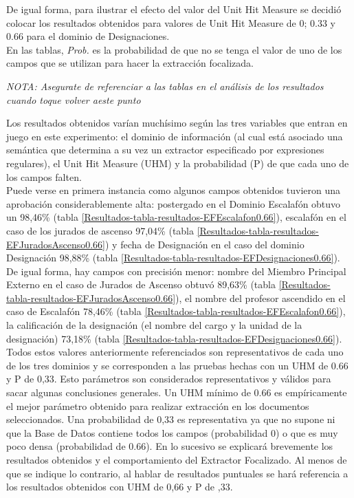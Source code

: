 De igual forma, para ilustrar el efecto del valor del Unit Hit Measure se decidió colocar los resultados obtenidos para valores de Unit Hit Measure de 0; 0.33 y 0.66 para el dominio de Designaciones.\\

En las tablas, \emph{Prob.} es la probabilidad de que no se tenga el valor de uno de los campos que se utilizan para hacer la extracción focalizada.

\emph{NOTA: Asegurate de referenciar a las tablas en el análisis de los resultados cuando toque volver aeste punto} 



Los resultados obtenidos varían muchísimo según las tres variables que entran en juego en este experimento: el dominio de información (al cual está asociado una semántica que determina a su vez un extractor especificado por expresiones regulares), el Unit Hit Measure (UHM) y la probabilidad (P) de que cada uno de los campos falten.\\

Puede verse en primera instancia como algunos campos obtenidos tuvieron una aprobación considerablemente alta: postergado en el Dominio Escalafón obtuvo un 98,46\% (tabla \ref{Resultados-tabla-resultados-EFEscalafon0.66}), escalafón en el caso de los jurados de ascenso 97,04\% (tabla \ref{Resultados-tabla-resultados-EFJuradosAscenso0.66}) y fecha de Designación en el caso del dominio Designación 98,88\% (tabla \ref{Resultados-tabla-resultados-EFDesignaciones0.66}). De igual forma, hay campos con precisión menor: nombre del Miembro Principal Externo en el caso de Jurados de Ascenso obtuvó 89,63\% (tabla \ref{Resultados-tabla-resultados-EFJuradosAscenso0.66}), el nombre del profesor ascendido en el caso de Escalafón 78,46\% (tabla \ref{Resultados-tabla-resultados-EFEscalafon0.66}), la calificación de la designación (el nombre del cargo y la unidad de la designación) 73,18\% (tabla \ref{Resultados-tabla-resultados-EFDesignaciones0.66}). \\

Todos estos valores anteriormente referenciados son representativos de cada uno de los tres dominios y se corresponden a las pruebas hechas con un UHM de 0.66 y P de 0,33. Esto parámetros son considerados representativos y válidos para sacar algunas conclusiones generales. Un UHM mínimo de 0.66 es empíricamente el mejor parámetro obtenido para realizar extracción en los documentos seleccionados. Una probabilidad de 0,33 es representativa ya que no supone ni que la Base de Datos contiene todos los campos (probabilidad 0) o que es muy poco densa (probabilidad de 0.66). En lo sucesivo se explicará brevemente los resultados obtenidos y el comportamiento del Extractor Focalizado. Al menos de que se indique lo contrario, al hablar de resultados puntuales se hará referencia a los resultados obtenidos con UHM de 0,66 y P de ,33. \\

